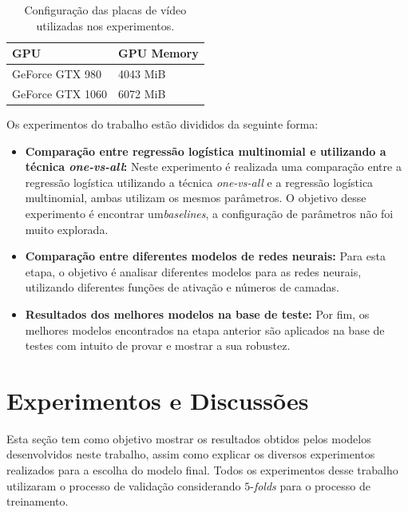 \documentclass[conference]{IEEEtran}
\begin{document}
\begin{table}[h!]
	\centering
	\begin{tabular}{ll} \toprule
		  \textbf{GPU} & \textbf{GPU Memory} \\ \toprule 	
		  GeForce GTX 980 & 4043 MiB \\ 
		  GeForce GTX 1060 & 6072 MiB \\ 
		 \bottomrule
	\end{tabular}
	\caption{Configuração das placas de vídeo utilizadas nos experimentos.}
	\label{tab:config}
\end{table}

Os experimentos do trabalho estão divididos da seguinte forma: 

\begin{itemize}
	\item \textbf{Comparação entre regressão logística multinomial e utilizando a técnica \emph{one-vs-all}:} Neste experimento é realizada uma comparação entre a regressão logística utilizando a técnica \emph{one-vs-all} e a regressão logística multinomial, ambas utilizam os mesmos parâmetros. O objetivo desse experimento é encontrar um\emph{baselines}, a configuração de parâmetros não foi muito explorada.
	
	\item \textbf{Comparação entre diferentes modelos de redes neurais:} Para esta etapa, o objetivo é analisar diferentes modelos para as redes neurais, utilizando diferentes funções de ativação e números de camadas.  
	
	\item \textbf{Resultados dos melhores modelos na base de teste:} Por fim, os melhores modelos encontrados na etapa anterior são aplicados na base de testes com intuito de provar e mostrar a sua robustez.
\end{itemize}


\section{Experimentos e Discussões}

Esta seção tem como objetivo mostrar os resultados obtidos pelos modelos desenvolvidos neste trabalho, assim como explicar os diversos experimentos realizados para a escolha do modelo final. Todos os experimentos desse trabalho utilizaram o processo de validação considerando $5$-\emph{folds} para o processo de treinamento. 
\end{document}
